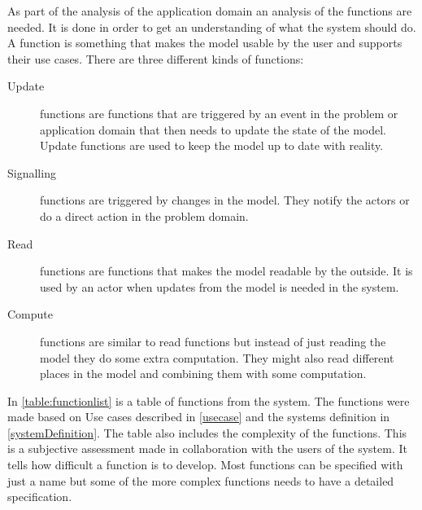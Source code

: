 As part of the analysis of the application domain an analysis of the functions are needed. It is done in order to get an understanding of what the system should do. A function is something that makes the model usable by the user and supports their use cases. There are three different kinds of functions:

\begin{description}
    \item[Update] functions are functions that are triggered by an event in the problem or application domain that then needs to update the state of the model. Update functions are used to keep the model up to date with reality.

    \item[Signalling] functions are triggered by changes in the model. They notify the actors or do a direct action in the problem domain.

    \item[Read] functions are functions that makes the model readable by
the outside. It is used by an actor when updates from the model is needed in the system.

    \item[Compute] functions are similar to read functions but instead of just reading the model they do some extra computation. They might also read different places in the model and combining them with some computation.
\end{description}

In \cref{table:functionlist} is a table of functions from the system. The functions were made based on Use cases described in \cref{usecase} and the systems definition in \cref{systemDefinition}. The table also includes the complexity of the functions. This is a subjective assessment made in collaboration with the users of the system. It tells how difficult a function is to develop. Most functions can be specified with just a name but some of the more complex functions needs to have a detailed specification.

